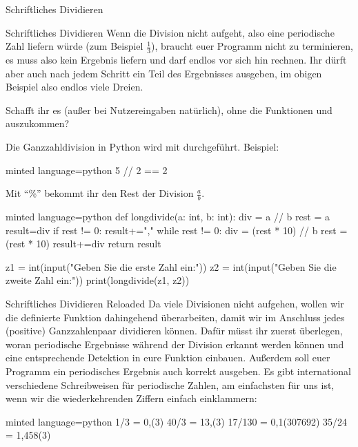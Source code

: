 \begin{task}[points=auto]{Schriftliches Dividieren}
\begin{subtask*}[points=0]{Schriftliches Dividieren }
        Wenn die Division nicht aufgeht, also eine periodische Zahl liefern würde (zum Beispiel $\frac13$), braucht euer Programm nicht zu terminieren, es muss also kein Ergebnis liefern und darf endlos vor sich hin rechnen.
        Ihr dürft aber auch nach jedem Schritt ein Teil des Ergebnisses ausgeben,
        im obigen Beispiel also endlos viele Dreien.

        Schafft ihr es (außer bei Nutzereingaben natürlich), ohne die Funktionen
         und  auszukommen?

        \begin{hinweis}
            Die Ganzzahldivision in Python wird mit \pythoninline{//} durchgeführt. Beispiel:
            \begin{codeBlock}[]{minted language=python}
                5 // 2 == 2
            \end{codeBlock}
            Mit \enquote{\%} bekommt ihr den Rest der Division $\frac{a}{b}$.
        \end{hinweis}

        \begin{solution}
            \begin{codeBlock}[]{minted language=python}
                def longdivide(a: int, b: int):
                    div = a // b
                    rest = a %
                    result=div
                    if rest != 0:
                        result+=","
                        while rest != 0:
                            div = (rest * 10) // b
                            rest = (rest * 10) %
                            result+=div
                    return result


                z1 = int(input("Geben Sie die erste Zahl ein:"))
                z2 = int(input("Geben Sie die zweite Zahl ein:"))
                print(longdivide(z1, z2))
            \end{codeBlock}
        \end{solution}
    \end{subtask*}
    \begin{subtask*}[points=0]{Schriftliches Dividieren Reloaded }
        Da viele Divisionen nicht aufgehen, wollen wir die definierte Funktion dahingehend überarbeiten, damit wir im Anschluss jedes (positive) Ganzzahlenpaar dividieren können.
        Dafür müsst ihr zuerst überlegen, woran periodische Ergebnisse während der Division erkannt werden können und eine entsprechende Detektion in eure Funktion einbauen.
        Außerdem soll euer Programm ein periodisches Ergebnis auch korrekt ausgeben. Es gibt international verschiedene Schreibweisen für periodische Zahlen, am einfachsten für uns ist, wenn wir die wiederkehrenden Ziffern einfach einklammern:
        \begin{codeBlock}[]{minted language=python}
            1/3 = 0,(3)
            40/3 = 13,(3)
            17/130 = 0,1(307692)
            35/24 = 1,458(3)
        \end{codeBlock}


\end{subtask*}
\end{task}
